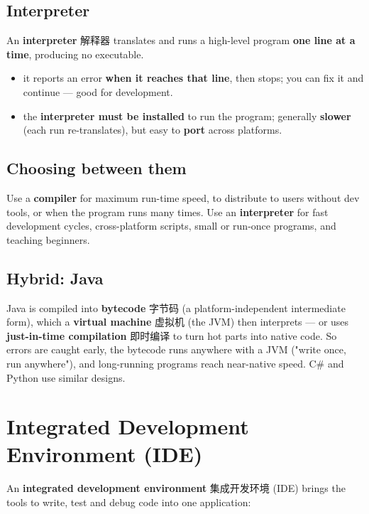 \documentclass[11pt]{article}
\begin{document}
\subsection*{Interpreter}

An \textbf{interpreter} 解释器 translates and runs a high-level program \textbf{one line at a time}, producing no executable.

\begin{itemize}
\item it reports an error \textbf{when it reaches that line}, then stops; you can fix it and continue — good for development.

\item the \textbf{interpreter must be installed} to run the program; generally \textbf{slower} (each run re-translates), but easy to \textbf{port} across platforms.

\end{itemize}

\subsection*{Choosing between them}

Use a \textbf{compiler} for maximum run-time speed, to distribute to users without dev tools, or when the program runs many times. Use an \textbf{interpreter} for fast development cycles, cross-platform scripts, small or run-once programs, and teaching beginners.

\subsection*{Hybrid: Java}

Java is compiled into \textbf{bytecode} 字节码 (a platform-independent intermediate form), which a \textbf{virtual machine} 虚拟机 (the JVM) then interprets — or uses \textbf{just-in-time compilation} 即时编译 to turn hot parts into native code. So errors are caught early, the bytecode runs anywhere with a JVM ("write once, run anywhere"), and long-running programs reach near-native speed. C\# and Python use similar designs.

\section*{Integrated Development Environment (IDE)}

An \textbf{integrated development environment} 集成开发环境 (IDE) brings the tools to write, test and debug code into one application:
\end{document}
